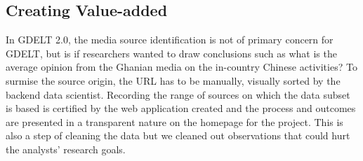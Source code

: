 \documentclass[preprint,authoryear,12pt]{elsarticle/elsarticle}
\begin{document}
\subsection{Creating Value-added}
In GDELT 2.0, the media source identification is not of primary concern for GDELT, but is if researchers wanted to draw conclusions such as what is the average opinion from the Ghanian media on the in-country Chinese activities? To surmise the source origin, the URL has to be manually, visually sorted by the backend data scientist. Recording the range of sources on which the data subset is based is certified by the web application created and the process and outcomes are presented in a transparent nature on the homepage for the project. This is also a step of cleaning the data but we cleaned out observations that could hurt the analysts’ research goals.




\end{document}
